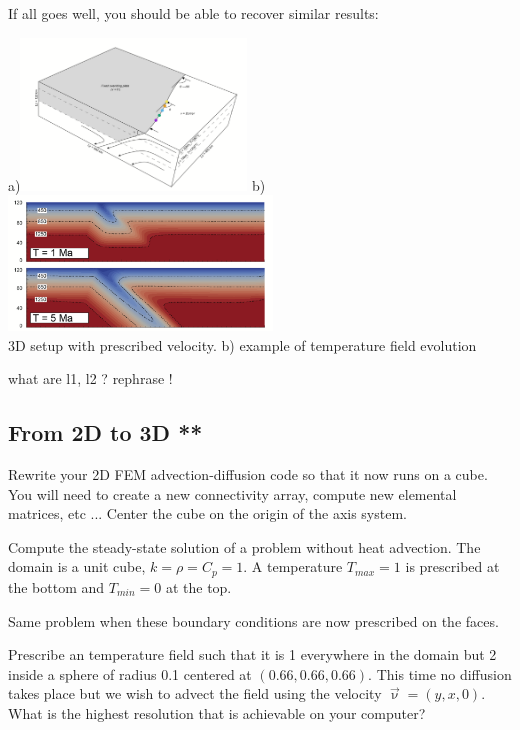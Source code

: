 If all goes well, you should be able to recover similar results:

\begin{center}
a)\includegraphics[width=6cm]{images/compgeo/corner1}
\hspace{1cm}
b)\includegraphics[width=7cm]{images/compgeo/corner2}\\
{\captionfont 3D setup with prescribed velocity. b) example of temperature field evolution}
\end{center}

{\color{red} what are l1, l2 ? rephrase !}

\subsection{From 2D to 3D **}

Rewrite your 2D FEM advection-diffusion code so that it now runs on a cube. 
You will need to create a new connectivity array, compute new elemental matrices, etc ...
Center the cube on the origin of the axis system.

Compute the steady-state solution of a problem without heat advection. The domain is a unit cube,
$k=\rho=C_p=1$. A temperature $T_{max}=1$ is prescribed at the bottom and $T_{min}=0$ at the top. 

Same problem when these boundary conditions are now prescribed on the faces.

Prescribe an temperature field such that it is 1 everywhere in the domain but 
2 inside a sphere of radius 0.1 centered at $(0.66,0.66,0.66)$.
This time no diffusion takes place but we wish to advect the field using the velocity
$\vec\upnu=(y,x,0)$. What is the highest resolution that is achievable on your computer?


